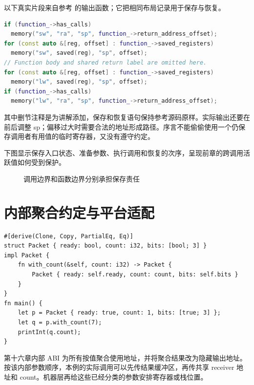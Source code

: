 以下真实片段来自参考  的输出函数；它把相同布局记录用于保存与恢复。
\begin{lstlisting}[language=C++,caption={参考序言与尾声使用同一帧记录}]
if (function_->has_calls)
  memory("sw", "ra", "sp", function_->return_address_offset);
for (const auto &[reg, offset] : function_->saved_registers)
  memory("sw", saved(reg), "sp", offset);
// Function body and shared return label are omitted here.
for (const auto &[reg, offset] : function_->saved_registers)
  memory("lw", saved(reg), "sp", offset);
if (function_->has_calls)
  memory("lw", "ra", "sp", function_->return_address_offset);
\end{lstlisting}
其中删节注释是为讲解添加，保存和恢复语句保持参考源码原样。实际输出还要在前后调整 sp；偏移过大时需要合法的地址形成路径。序言不能偷偷使用一个仍保存调用者有用值的临时寄存器，又没有遵守约定。

下图显示保存入口状态、准备参数、执行调用和恢复的次序，呈现前章的跨调用活跃值如何受到保护。
\begin{figure}[htbp]\centering
{}
\caption{调用边界和函数边界分别承担保存责任}
\end{figure}

\section{内部聚合约定与平台适配}
\begin{lstlisting}[language=Rustless,caption={方法的聚合结果与标量参数需要共同分类}]
#[derive(Clone, Copy, PartialEq, Eq)]
struct Packet { ready: bool, count: i32, bits: [bool; 3] }
impl Packet {
    fn with_count(&self, count: i32) -> Packet {
        Packet { ready: self.ready, count: count, bits: self.bits }
    }
}
fn main() {
    let p = Packet { ready: true, count: 1, bits: [true; 3] };
    let q = p.with_count(7);
    printInt(q.count);
}
\end{lstlisting}
第十六章内部 ABI 为所有按值聚合使用地址，并将聚合结果改为隐藏输出地址。按该内部参数顺序，本例的实际调用可以先传结果缓冲区，再传共享 receiver 地址和 count。机器层再给这些已经分类的参数安排寄存器或栈位置。

